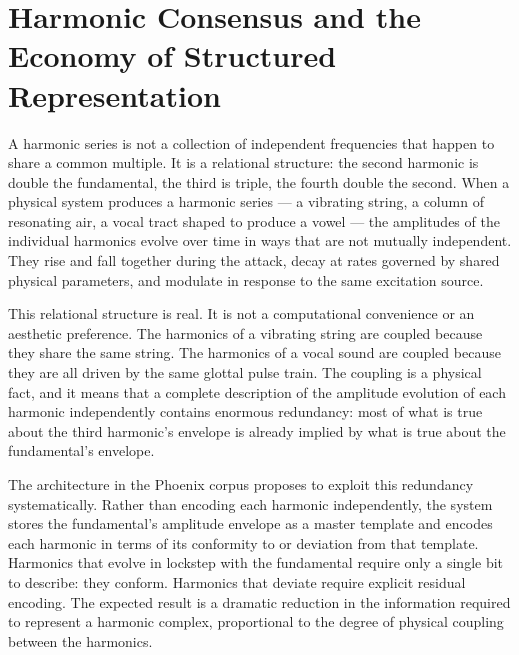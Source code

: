 
\chapter{Harmonic Consensus and the Economy of Structured Representation}
\label{ch:hcf1}


\noindent
A harmonic series is not a collection of independent frequencies
that happen to share a common multiple. It is a relational structure:
the second harmonic is double the fundamental, the third is triple,
the fourth double the second. When a physical system produces a
harmonic series --- a vibrating string, a column of resonating air,
a vocal tract shaped to produce a vowel --- the amplitudes of the
individual harmonics evolve over time in ways that are not mutually
independent. They rise and fall together during the attack, decay
at rates governed by shared physical parameters, and modulate in
response to the same excitation source.

This relational structure is real. It is not a computational
convenience or an aesthetic preference. The harmonics of a vibrating
string are coupled because they share the same string. The harmonics
of a vocal sound are coupled because they are all driven by the
same glottal pulse train. The coupling is a physical fact, and it
means that a complete description of the amplitude evolution of each
harmonic independently contains enormous redundancy: most of what
is true about the third harmonic's envelope is already implied by
what is true about the fundamental's envelope.

The \HCFone{} architecture in the Phoenix corpus proposes to exploit
this redundancy systematically. Rather than encoding each harmonic
independently, the system stores the fundamental's amplitude envelope
as a master template and encodes each harmonic in terms of its
conformity to or deviation from that template. Harmonics that evolve
in lockstep with the fundamental require only a single bit to
describe: they conform. Harmonics that deviate require explicit
residual encoding. The expected result is a dramatic reduction in
the information required to represent a harmonic complex,
proportional to the degree of physical coupling between the harmonics.

